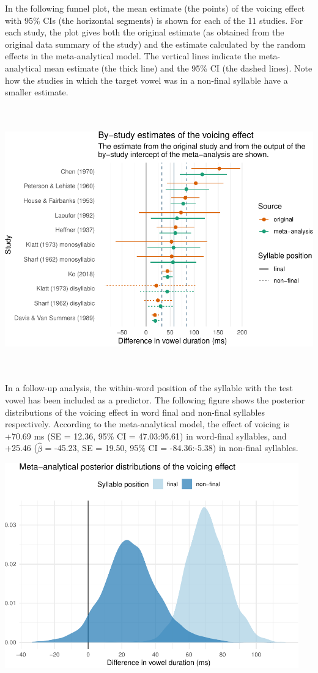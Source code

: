 \documentclass[12pt,]{article}
\begin{document}
In the following funnel plot, the mean estimate (the points) of the
voicing effect with 95\% CIs (the horizontal segments) is shown for each
of the 11 studies. For each study, the plot gives both the original
estimate (as obtained from the original data summary of the study) and
the estimate calculated by the random effects in the meta-analytical
model. The vertical lines indicate the meta-analytical mean estimate
(the thick line) and the 95\% CI (the dashed lines). Note how the
studies in which the target vowel was in a non-final syllable have a
smaller estimate.

\begin{center}\includegraphics[width=6in,height=4.5in]{2019-02-04_files/figure-latex/origin-shrunk-1} \end{center}

In a follow-up analysis, the within-word position of the syllable with
the test vowel has been included as a predictor. The following figure
shows the posterior distributions of the voicing effect in word final
and non-final syllables respectively. According to the meta-analytical
model, the effect of voicing is +70.69 ms (SE = 12.36, 95\% CI =
47.03:95.61) in word-final syllables, and +25.46 (\(\hat{\beta{}}\) =
-45.23, SE = 19.50, 95\% CI = -84.36:-5.38) in non-final syllables.

\begin{center}\includegraphics[width=5in,height=3.5in]{2019-02-04_files/figure-latex/syl-plot-1} \end{center}

\nocite{chen1970, peterson1960, house1953, laeufer1992, heffner1937, klatt1973, sharf1962, ko2018, davis1989}


\end{document}
